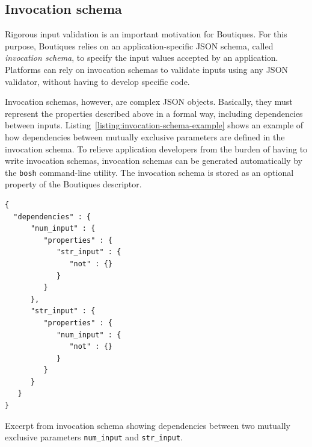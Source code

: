 \documentclass[a4paper,num-refs]{oup-contemporary}
\newcommand{\boutiques}{Boutiques\xspace}
\newcommand{\notimplementedyet}[1]{\color{blue}\emph{#1}\footnote{Still needs to be implemented}\color{black}\xspace}
\begin{document}
\subsection{Invocation schema}
\label{sec:invocation-schema}

Rigorous input validation is an important motivation for
\boutiques. For this purpose, \boutiques relies on an
application-specific JSON schema, called \emph{invocation schema}, to
specify the input values accepted by an application. Platforms can
rely on invocation schemas to validate inputs using
any JSON validator, without having to develop specific code.

Invocation schemas, however, are complex JSON objects. Basically, they
must represent the properties described above in a formal way,
including dependencies between
inputs. Listing~\ref{listing:invocation-schema-example} shows an
example of how dependencies between mutually exclusive parameters are
defined in the invocation schema. To relieve application developers
from the burden of having to write invocation schemas, invocation
schemas can be generated automatically by the \texttt{bosh}
command-line utility. The invocation schema is stored as an optional
property of the \boutiques descriptor.


\begin{listing}
\begin{verbatim}
{
  "dependencies" : {
      "num_input" : {
         "properties" : {
            "str_input" : {
               "not" : {}
            }
         }
      },
      "str_input" : {
         "properties" : {
            "num_input" : {
               "not" : {}
            }
         }
      }
   }
}
\end{verbatim}
\caption{Excerpt from invocation schema showing dependencies between
  two mutually exclusive parameters \texttt{num\_input} and
  \texttt{str\_input}.}
\label{listing:invocation-schema-example}
\end{listing}
\end{document}
